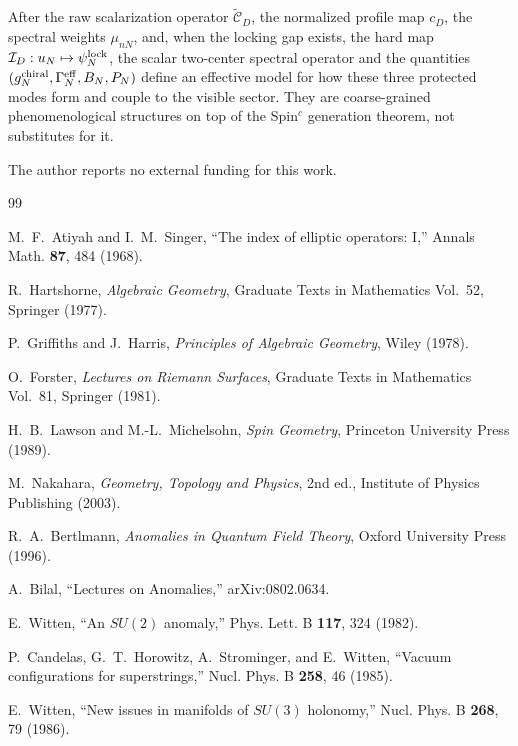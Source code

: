 \documentclass[aps,prd,preprint,notitlepage,nofootinbib,superscriptaddress,floatfix]{revtex4-2}
\theoremstyle{remark}
\begin{document}
After the raw scalarization operator \(\widetilde{\mathcal C}_D\), the normalized profile map \(c_D\), the spectral weights \(\mu_{nN}\), and, when the locking gap exists, the hard map \(\mathcal I_D:u_N\mapsto\psi_N^{\rm lock}\), the scalar two-center spectral operator and the quantities \((g_N^{\rm chiral},\Gamma_N^{\rm eff},B_N,P_N)\) define an effective model for how these three protected modes form and couple to the visible sector.
They are coarse-grained phenomenological structures on top of the Spin\(^c\) generation theorem, not substitutes for it.

\begin{acknowledgments}
The author reports no external funding for this work.
\end{acknowledgments}

\begin{thebibliography}{99}

M.~F.~Atiyah and I.~M.~Singer,
``The index of elliptic operators: I,''
Annals Math. \textbf{87}, 484 (1968).

R.~Hartshorne,
\textit{Algebraic Geometry},
Graduate Texts in Mathematics Vol.~52,
Springer (1977).

P.~Griffiths and J.~Harris,
\textit{Principles of Algebraic Geometry},
Wiley (1978).

O.~Forster,
\textit{Lectures on Riemann Surfaces},
Graduate Texts in Mathematics Vol.~81,
Springer (1981).

H.~B.~Lawson and M.-L.~Michelsohn,
\textit{Spin Geometry},
Princeton University Press (1989).

M.~Nakahara,
\textit{Geometry, Topology and Physics},
2nd ed.,
Institute of Physics Publishing (2003).

R.~A.~Bertlmann,
\textit{Anomalies in Quantum Field Theory},
Oxford University Press (1996).

A.~Bilal,
``Lectures on Anomalies,''
arXiv:0802.0634.

E.~Witten,
``An \(SU(2)\) anomaly,''
Phys. Lett. B \textbf{117}, 324 (1982).

P.~Candelas, G.~T.~Horowitz, A.~Strominger, and E.~Witten,
``Vacuum configurations for superstrings,''
Nucl. Phys. B \textbf{258}, 46 (1985).

E.~Witten,
``New issues in manifolds of \(SU(3)\) holonomy,''
Nucl. Phys. B \textbf{268}, 79 (1986).


\end{thebibliography}
\end{document}
